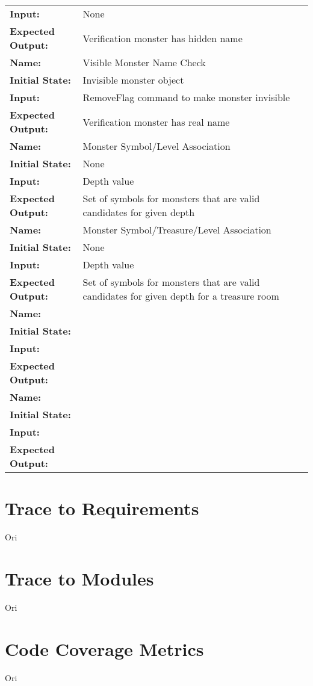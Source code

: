 \documentclass[12pt, titlepage]{article}
\begin{document}
\begin{center}
\begin{longtable}{ l | l }
\textbf{Input:} & None\\
\textbf{Expected Output:} & Verification monster has hidden name\\
\hline
\textbf{Name:} & Visible Monster Name Check\\
\textbf{Initial State:} & Invisible monster object\\
\textbf{Input:} & RemoveFlag command to make monster invisible\\
\textbf{Expected Output:} & Verification monster has real name\\
\hline
\textbf{Name:} & Monster Symbol/Level Association\\
\textbf{Initial State:} & None\\
\textbf{Input:} & Depth value\\
\textbf{Expected Output:} & Set of symbols for monsters that are valid candidates for given depth\\
\hline
\textbf{Name:} & Monster Symbol/Treasure/Level Association\\
\textbf{Initial State:} & None\\
\textbf{Input:} & Depth value\\
\textbf{Expected Output:} & Set of symbols for monsters that are valid candidates for given depth for a treasure room\\
\hline
\textbf{Name:} & \\
\textbf{Initial State:} & \\
\textbf{Input:} & \\
\textbf{Expected Output:} & \\
\hline



\textbf{Name:} & \\
\textbf{Initial State:} & \\
\textbf{Input:} & \\
\textbf{Expected Output:} & \\
\hline

\end{longtable}

\end{center}
		
\section{Trace to Requirements}
	Ori

\section{Trace to Modules}		
	Ori

\section{Code Coverage Metrics}
	Ori




\end{document}
